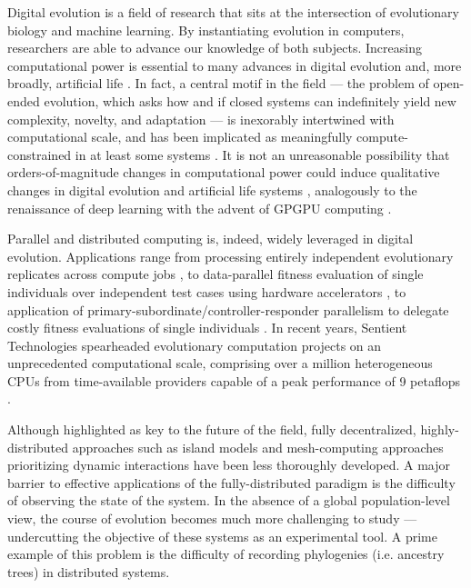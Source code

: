 Digital evolution is a field of research that sits at the intersection of evolutionary biology and machine learning.
By instantiating evolution in computers, researchers are able to advance our knowledge of both subjects.
Increasing computational power is essential to many advances in digital evolution and, more broadly, artificial life \citep{ackley2014indefinitely}.
In fact, a central motif in the field --- the problem of open-ended evolution, which asks how and if closed systems can indefinitely yield new complexity, novelty, and adaptation --- is inexorably intertwined with computational scale, and has been implicated as meaningfully compute-constrained in at least some systems \citep{taylor2016open,channon2019maximum}.
It is not an unreasonable possibility that orders-of-magnitude changes in computational power could induce qualitative changes in digital evolution and artificial life systems \citep{moreno2022engineering}, analogously to the renaissance of deep learning with the advent of GPGPU computing \citep{krizhevsky2012imagenet}.

Parallel and distributed computing is, indeed, widely leveraged in digital evolution.
Applications range from processing entirely independent evolutionary replicates across compute jobs \citep{dolson2017spatial, hornby2006automated}, to data-parallel fitness evaluation of single individuals over independent test cases using hardware accelerators \citep{harding2007fast_springer, langdon2019continuous}, to application of primary-subordinate/controller-responder parallelism to delegate costly fitness evaluations of single individuals \citep{cantu2001master,miikkulainen2019evolving}.
In recent years, Sentient Technologies spearheaded evolutionary computation projects on an unprecedented computational scale, comprising over a million heterogeneous CPUs from time-available providers capable of a peak performance of 9 petaflops \citep{miikkulainen2019evolving,gilbert2015artificial,blondeau2009distributed}.

Although highlighted as key to the future of the field, fully decentralized, highly-distributed approaches such as island models \citep{bennett1999building,schulte2010genetic} and mesh-computing approaches prioritizing dynamic interactions \citep{ray1995proposal,ackley2018digital,moreno2021conduit} have been less thoroughly developed.
A major barrier to effective applications of the fully-distributed paradigm is the difficulty of observing the state of the system.
In the absence of a global population-level view, the course of evolution becomes much more challenging to study --- undercutting the objective of these systems as an experimental tool.
A prime example of this problem is the difficulty of recording phylogenies (i.e. ancestry trees) in distributed systems.

